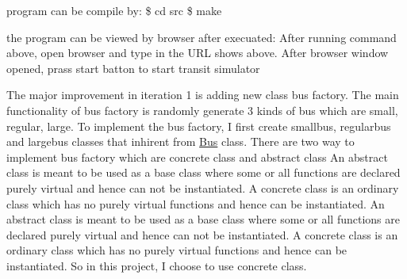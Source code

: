 program can be compile by\+: \$ cd src \$ make

the program can be viewed by browser after execuated\+: After running command above, open browser and type in the U\+RL shows above. After browser window opened, prass start batton to start transit simulator

The major improvement in iteration 1 is adding new class bus factory. The main functionality of bus factory is randomly generate 3 kinds of bus which are small, regular, large. To implement the bus factory, I first create smallbus, regularbus and largebus classes that inhirent from \hyperlink{classBus}{Bus} class. There are two way to implement bus factory which are concrete class and abstract class An abstract class is meant to be used as a base class where some or all functions are declared purely virtual and hence can not be instantiated. A concrete class is an ordinary class which has no purely virtual functions and hence can be instantiated. An abstract class is meant to be used as a base class where some or all functions are declared purely virtual and hence can not be instantiated. A concrete class is an ordinary class which has no purely virtual functions and hence can be instantiated. So in this project, I choose to use concrete class. 
